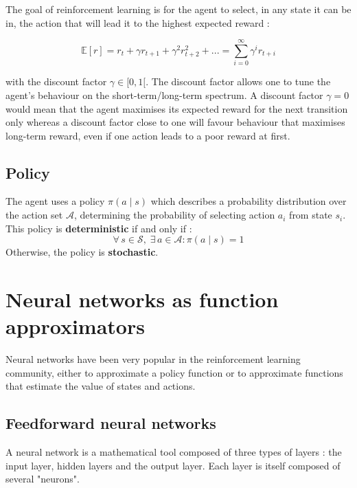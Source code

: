 The goal of reinforcement learning is for the agent to select, in any state it
can be in, the action that will lead it to the highest expected reward :

\begin{equation}
\mathbb{E}[r] = r_t + \gamma r_{t+1} + \gamma^2 r_{t+2}^2 + ... =
 \sum\limits_{i=0}^\infty \gamma^i r_{t+i}
\end{equation}

\noindent with the discount factor  $\gamma \in [0, 1[$.
The discount factor allows one to tune the agent's behaviour on the
short-term/long-term spectrum. A discount factor $\gamma=0$ would mean that the
agent maximises its expected reward for the next transition only whereas a
discount factor close to one will favour behaviour that maximises long-term
reward, even if one action leads to a poor reward at first.\\

\subsection{Policy}
The agent uses a policy $\pi(a \mid s)$ which describes a probability
distribution over the action set $\mathcal{A}$, determining the probability of
selecting action $a_i$ from state $s_i$. This policy is 
\textbf{deterministic} if and only if :
\begin{equation}
\forall\, s \in \mathcal{S},\; \exists\, a \in \mathcal{A} : \pi(a \mid s) = 1
\end{equation}
\noindent Otherwise, the policy is \textbf{stochastic}.


\section{Neural networks as function approximators}
Neural networks have been very popular in the reinforcement learning community,
either to approximate a policy function or to approximate functions that
estimate the value of states and actions.\\

\subsection{Feedforward neural networks}
A neural network is a mathematical tool composed of three types of layers : 
the input layer, hidden layers and the output layer. Each layer is itself
composed of several "neurons".\\

